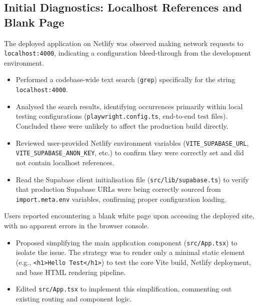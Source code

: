 \documentclass[11pt]{article} %
\begin{document}
\subsection{Initial Diagnostics: Localhost References and Blank Page}
\begin{description}[style=unboxed,leftmargin=0pt]
    \item[Problem 1:] The deployed application on Netlify was observed making network requests to \texttt{localhost:4000}, indicating a configuration bleed-through from the development environment.
    \item[AI Assistance (Diagnostics):]
        \begin{itemize}
            \item Performed a codebase-wide text search (\texttt{grep}) specifically for the string \texttt{localhost:4000}.
            \item Analysed the search results, identifying occurrences primarily within local testing configurations (\texttt{playwright.config.ts}, end-to-end test files). Concluded these were unlikely to affect the production build directly.
            \item Reviewed user-provided Netlify environment variables (\texttt{VITE\_SUPABASE\_URL}, \texttt{VITE\_SUPABASE\_ANON\_KEY}, etc.) to confirm they were correctly set and did not contain localhost references.
            \item Read the Supabase client initialisation file (\texttt{src/lib/supabase.ts}) to verify that production Supabase URLs were being correctly sourced from \texttt{import.meta.env} variables, confirming proper configuration loading.
        \end{itemize}
    \item[Problem 2:] Users reported encountering a blank white page upon accessing the deployed site, with no apparent errors in the browser console.
    \item[AI Assistance (Debugging Strategy \& Implementation):]
        \begin{itemize}
            \item Proposed simplifying the main application component (\texttt{src/App.tsx}) to isolate the issue. The strategy was to render only a minimal static element (e.g., \texttt{<h1>Hello Test</h1>}) to test the core Vite build, Netlify deployment, and base HTML rendering pipeline.
            \item Edited \texttt{src/App.tsx} to implement this simplification, commenting out existing routing and component logic.

\end{itemize}
\end{description}
\end{document}
